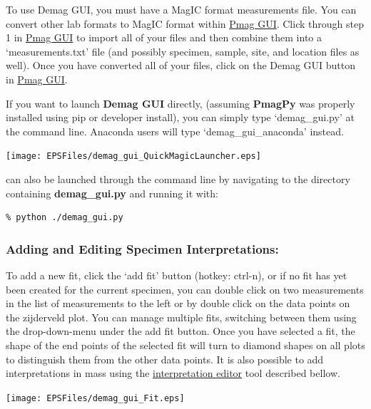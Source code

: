 \documentclass[11pt]{book}
\begin{document}
{{\noindent To use Demag GUI, you must have a MagIC format measurements file.  You can convert other lab formats to MagIC format within \href{#pmag_gui.py}{Pmag GUI}.  Click through step 1 in \href{#pmag_gui.py}{Pmag GUI} to import all of your files and then combine them into a `measurements.txt' file (and possibly specimen, sample, site, and location files as well).  Once you have converted all of your files, click on the Demag GUI button in \href{#pmag_gui.py}{Pmag GUI}.


\noindent If you want to launch {\bf Demag GUI} directly, (assuming {\bf PmagPy} was properly installed using pip or developer install), you can simply type `demag\_gui.py' at the command line. Anaconda users will type `demag\_gui\_anaconda' instead.


\texttt{[image: EPSFiles/demag\_gui\_QuickMagicLauncher.eps]}

 can also be launched through the command line by navigating to the directory containing {\bf demag\_gui.py}  and running it with:\\

\begin{verbatim}
% python ./demag_gui.py
\end{verbatim}



\subsubsection{Adding and Editing Specimen Interpretations:}\label{adding-interpretations}

To add a new fit, click the `add fit' button (hotkey: ctrl-n), or if no fit has yet been created for the current specimen, you can double click on two measurements in the list of measurements to the left or by double click on the data points on the zijderveld plot.  You can manage multiple fits, switching between them using the drop-down-menu under the add fit button.  Once you have selected a fit, the shape of the end points of the selected fit will turn to diamond shapes on all plots to distinguish them from the other data points.  It is also possible to add interpretations in mass using the \hyperref[interpretation-editor]{interpretation editor} tool described bellow.

\texttt{[image: EPSFiles/demag\_gui\_Fit.eps]}

}}
\end{document}
